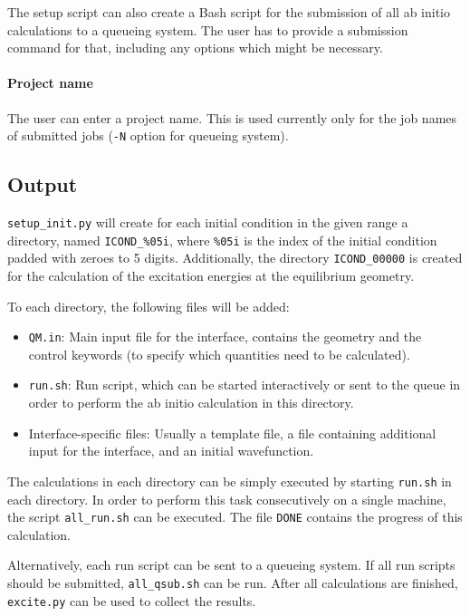 \documentclass[a4paper,11pt,DIV=15,openany,twoside=false]{scrbook}
\newcommand{\ttt}[1]{\texttt{#1}}
\begin{document}
The setup script can also create a Bash script for the submission of all ab initio calculations to a queueing system. The user has to provide a submission command for that, including any options which might be necessary.

\paragraph{Project name}

The user can enter a project name. This is used currently only for the job names of submitted jobs (\ttt{-N} option for queueing system).

\subsection{Output}

\ttt{setup\_init.py} will create for each initial condition in the given range a directory, named \ttt{ICOND\_\%05i}, where \ttt{\%05i} is the index of the initial condition padded with zeroes to 5 digits. Additionally, the directory \ttt{ICOND\_00000} is created for the calculation of the excitation energies at the equilibrium geometry.

To each directory, the following files will be added:
\begin{itemize}
  \item \ttt{QM.in}: Main input file for the interface, contains the geometry and the control keywords (to specify which quantities need to be calculated). 
  \item \ttt{run.sh}: Run script, which can be started interactively or sent to the queue in order to perform the ab initio calculation in this directory.
  \item Interface-specific files: Usually a template file, a file containing additional input for the interface, and an initial wavefunction.
\end{itemize}

The calculations in each directory can be simply executed by starting \ttt{run.sh} in each directory. In order to perform this task consecutively on a single machine, the script \ttt{all\_run.sh} can be executed. The file \ttt{DONE} contains the progress of this calculation.

Alternatively, each run script can be sent to a queueing system. If all run scripts should be submitted, \ttt{all\_qsub.sh} can be run. After all calculations are finished, \ttt{excite.py} can be used to collect the results.
\end{document}
